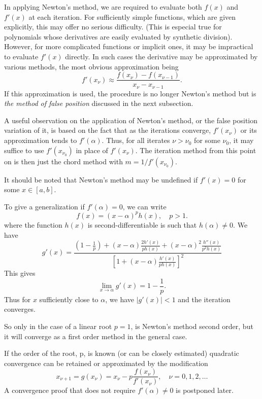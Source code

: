 \documentclass[../main.tex]{subfiles}
\begin{document}
In applying Newton's method, we are required to evaluate both $f(x)$ and $f'(x)$ at each iteration. For sufficiently simple functions, which are given explicitly, this may offer no serious difficulty. (This is especial true for polynomials whose derivatives are easily evaluated by synthetic division). However, for more complicated functions or implicit ones, it may be impractical to evaluate $f'(x)$ directly. In such cases the derivative may be approximated by various methods, the most obvious approximation being
\begin{equation}
	f'(x_\nu) \approx \frac{f(x_\nu) - f(x_{\nu-1})}{x_\nu - x_{\nu-1}}.
\end{equation}
If this approximation is used, the procedure is no longer Newton's method but is \emph{the method of false position} discussed in the next subsection.

A useful observation on the application of Newton's method, or the false position variation of it, is based on the fact that as the iterations converge, $f'(x_\nu)$ or its approximation tends to $f'(\alpha)$. Thus, for all iterates $\nu > \nu_0$ for some $\nu_0$, it may suffice to use $f'(x_{\nu_0})$ in place of $f'(x_\nu)$. The iteration method from this point on is then just the chord method with $m = 1/f'(x_{\nu_0})$.

It should be noted that Newton's method may be undefined if $f'(x) = 0$ for some $x \in [a,b]$.

To give a generalization if $f'(\alpha) = 0$, we can write
\begin{equation}
	f(x) = (x - \alpha)^p h(x), \quad p > 1.
\end{equation}
where the function $h(x)$ is second-differentiable is such that $h(\alpha) \neq 0$. We have
\begin{equation}
	g'(x) = \frac{\left(1 - \frac{1}{p}\right) + (x - \alpha) \frac{2h'(x)}{ph(x)} + (x - \alpha)^2 \frac{h''(x)}{p^2h(x)}}{\left[ 1 + (x - \alpha) \frac{h'(x)}{ph(x)} \right]^2}
\end{equation}
This gives
\begin{equation}
	\lim_{x \to \alpha} g'(x) = 1 - \frac{1}{p}.
\end{equation}
Thus for $x$ sufficiently close to $\alpha$, we have $|g'(x)| < 1$ and the iteration converges.

\begin{plainblackenv}
	So only in the case of a linear root $p=1$, is Newton's method second order, but it will converge as a first order method in the general case.
\end{plainblackenv}
If the order of the root, p, is known (or can be closely estimated) quadratic convergence can be retained or approximated by the modification
\begin{equation}
	x_{\nu+1} = g(x_\nu) = x_\nu - p \frac{f(x_\nu)}{f'(x_\nu)}, \quad \nu = 0, 1, 2, \ldots
\end{equation}
A convergence proof that does not require $f'(\alpha) \neq 0$ is postponed later.
\end{document}
